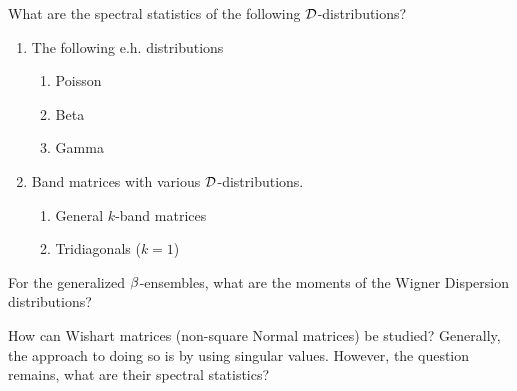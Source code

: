 
\medskip
 What are the spectral statistics of the following $\mathcal{D}$-distributions?

\begin{enumerate}
  \item The following e.h. distributions
    \begin{enumerate}
      \item Poisson
      \item Beta
      \item Gamma
    \end{enumerate}
  \item Band matrices with various $\mathcal{D}$-distributions.
    \begin{enumerate}
      \item General $k$-band matrices
      \item Tridiagonals ($k = 1$)
    \end{enumerate}
\end{enumerate}

\medskip
 For the generalized $\beta$-ensembles, what are the moments of the Wigner Dispersion distributions?

\medskip
 How can Wishart matrices (non-square Normal matrices) be studied?
Generally, the approach to doing so is by using singular values. However, the question remains, what are their spectral statistics?
